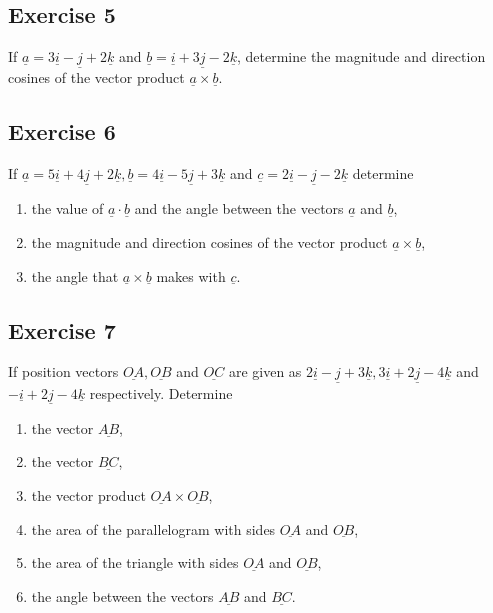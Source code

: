 \documentclass[
  11pt,
  oneside]{book}
\providecommand{\tightlist}{%
  \setlength{\itemsep}{0pt}\setlength{\parskip}{0pt}}
\newcommand{\slide}{}
\theoremstyle{definition}
\theoremstyle{definition}
\theoremstyle{definition}
\theoremstyle{definition}
\theoremstyle{remark}
\begin{document}
\slide

\subsection*{Exercise 5}\label{exercise-5-8}

If \(\underline{a} = 3\underline{i} - \underline{j} + 2\underline{k}\) and \(\underline{b} = \underline{i} + 3\underline{j} - 2\underline{k}\), determine the magnitude and direction cosines of the vector product \(\underline{a} \times \underline{b}\).

\slide

\subsection*{Exercise 6}\label{exercise-6-6}

If \(\underline{a} = 5\underline{i} + 4\underline{j} + 2\underline{k}, \underline{b} = 4\underline{i} - 5\underline{j} + 3\underline{k}\) and \(\underline{c} = 2\underline{i} - \underline{j} - 2\underline{k}\) determine

\begin{enumerate}
\def\labelenumi{\roman{enumi}.}
\tightlist
\item
  the value of \(\underline{a} \cdot \underline{b}\) and the angle between the vectors \(\underline{a}\) and \(\underline{b}\),
\item
  the magnitude and direction cosines of the vector product \(\underline{a} \times \underline{b}\),
\item
  the angle that \(\underline{a} \times \underline{b}\) makes with \(\underline{c}\).
\end{enumerate}

\slide

\subsection*{Exercise 7}\label{exercise-7-3}

If position vectors \(\underline{OA}, \underline{OB}\) and \(\underline{OC}\) are given as \(2\underline{i} - \underline{j} + 3\underline{k}, 3\underline{i} + 2\underline{j} - 4\underline{k}\) and \(-\underline{i} + 2\underline{j} - 4\underline{k}\) respectively. Determine

\begin{enumerate}
\def\labelenumi{\roman{enumi}.}
\tightlist
\item
  the vector \(\underline{AB}\),
\item
  the vector \(\underline{BC}\),
\item
  the vector product \(\underline{OA} \times \underline{OB}\),
\item
  the area of the parallelogram with sides \(\underline{OA}\) and \(\underline{OB}\),
\item
  the area of the triangle with sides \(\underline{OA}\) and \(\underline{OB}\),
\item
  the angle between the vectors \(\underline{AB}\) and \(\underline{BC}\).
\end{enumerate}
\end{document}
